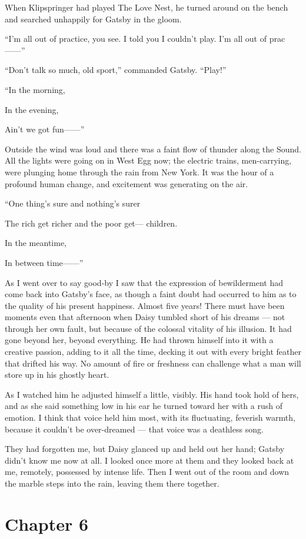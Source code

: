\documentclass{znotebook}
\begin{document}
When Klipspringer had played The Love Nest, he turned around on the bench and searched unhappily for Gatsby in the gloom.

``I’m all out of practice, you see. I told you I couldn’t play. I’m all out of prac ——''

``Don’t talk so much, old sport,'' commanded Gatsby. ``Play!''

``In the morning,

In the evening,

Ain’t we got fun——''

Outside the wind was loud and there was a faint flow of thunder along the Sound. All the lights were going on in West Egg now; the electric trains, men-carrying, were plunging home through the rain from New York. It was the hour of a profound human change, and excitement was generating on the air.

``One thing’s sure and nothing’s surer

The rich get richer and the poor get— children.

In the meantime,

In between time——''

As I went over to say good-by I saw that the expression of bewilderment had come back into Gatsby’s face, as though a faint doubt had occurred to him as to the quality of his present happiness. Almost five years! There must have been moments even that afternoon when Daisy tumbled short of his dreams — not through her own fault, but because of the colossal vitality of his illusion. It had gone beyond her, beyond everything. He had thrown himself into it with a creative passion, adding to it all the time, decking it out with every bright feather that drifted his way. No amount of fire or freshness can challenge what a man will store up in his ghostly heart.

As I watched him he adjusted himself a little, visibly. His hand took hold of hers, and as she said something low in his ear he turned toward her with a rush of emotion. I think that voice held him most, with its fluctuating, feverish warmth, because it couldn’t be over-dreamed — that voice was a deathless song.

They had forgotten me, but Daisy glanced up and held out her hand; Gatsby didn’t know me now at all. I looked once more at them and they looked back at me, remotely, possessed by intense life. Then I went out of the room and down the marble steps into the rain, leaving them there together.

\chapter{Chapter 6}
\end{document}

